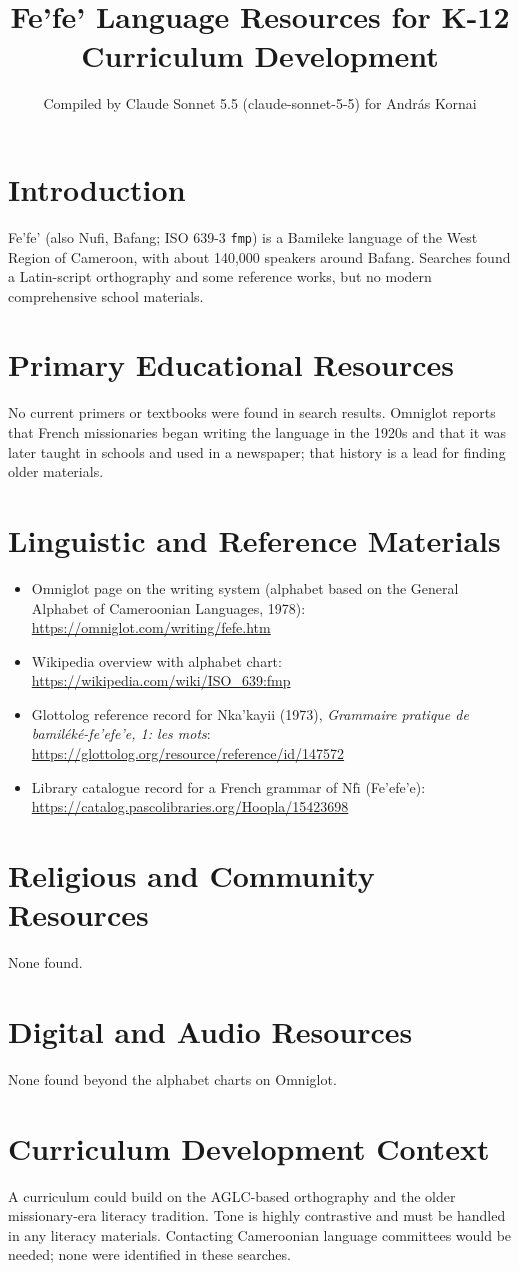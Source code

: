 \documentclass[12pt]{article}
\title{Fe'fe' Language Resources for K-12 Curriculum Development}
\author{Compiled by Claude Sonnet 5.5 (claude-sonnet-5-5) for Andr\'as Kornai}
\date{}
\begin{document}
\maketitle

\section{Introduction}
Fe'fe' (also Nufi, Bafang; ISO 639-3 \texttt{fmp}) is a Bamileke language of the West Region of Cameroon, with about 140,000 speakers around Bafang. Searches found a Latin-script orthography and some reference works, but no modern comprehensive school materials.

\section{Primary Educational Resources}
No current primers or textbooks were found in search results. Omniglot reports that French missionaries began writing the language in the 1920s and that it was later taught in schools and used in a newspaper; that history is a lead for finding older materials.

\section{Linguistic and Reference Materials}
\begin{itemize}
\item Omniglot page on the writing system (alphabet based on the General Alphabet of Cameroonian Languages, 1978): \url{https://omniglot.com/writing/fefe.htm}
\item Wikipedia overview with alphabet chart: \url{https://wikipedia.com/wiki/ISO_639:fmp}
\item Glottolog reference record for Nka'kayii (1973), \emph{Grammaire pratique de bamil\'ek\'e-fe'efe'e, 1: les mots}: \url{https://glottolog.org/resource/reference/id/147572}
\item Library catalogue record for a French grammar of Nf\={\i} (Fe'efe'e): \url{https://catalog.pascolibraries.org/Hoopla/15423698}
\end{itemize}

\section{Religious and Community Resources}
None found.

\section{Digital and Audio Resources}
None found beyond the alphabet charts on Omniglot.

\section{Curriculum Development Context}
A curriculum could build on the AGLC-based orthography and the older missionary-era literacy tradition. Tone is highly contrastive and must be handled in any literacy materials. Contacting Cameroonian language committees would be needed; none were identified in these searches.
\end{document}
